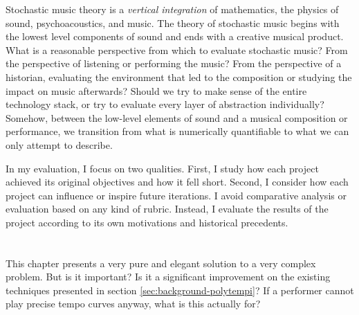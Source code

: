 Stochastic music theory is a \textit{vertical integration} of
mathematics, the physics of sound, psychoacoustics, and music. The
theory of stochastic music begins with the lowest level components of
sound and ends with a creative musical product. What is a reasonable
perspective from which to evaluate stochastic music? From the
perspective of listening or performing the music? From the
perspective of a historian, evaluating the environment that led to the
composition or studying the impact on music afterwards?  Should we
try to make sense of the entire technology stack, or try to evaluate
every layer of abstraction individually? Somehow, between the
low-level elements of sound and a musical composition or performance,
we transition from what is numerically quantifiable to what we can
only attempt to describe.

In my evaluation, I focus on two qualities. First, I study how each
project achieved its original objectives and how it fell short. Second,
I consider how each project can influence or inspire future
iterations. I avoid comparative analysis or evaluation based on any
kind of rubric. Instead, I evaluate the results of the project
according to its own motivations and historical precedents.


\section{\polytempic}
This chapter presents a very pure and elegant solution to a very
complex problem. But is it important? Is it a significant improvement
on the existing techniques presented in section
\ref{sec:background-polytempi}? If a performer cannot play precise
tempo curves anyway, what is this actually for?

